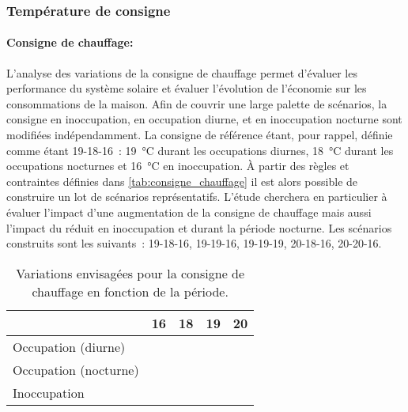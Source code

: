 \subsubsection{Température de consigne} %
\label{ssub:temperature_de_consigne}
\paragraph{Consigne de chauffage:} %
\label{par:consigne_de_chauffage}
L’analyse des variations de la consigne de chauffage permet d’évaluer les performance du
système solaire et évaluer l’évolution de l’économie sur les consommations de la maison.
Afin de couvrir une large palette de scénarios, la consigne en inoccupation, en occupation
diurne, et en inoccupation nocturne sont modifiées indépendamment. La consigne de
référence étant, pour rappel, définie comme étant 19-18-16~: \SI{19}{\celsius} durant les
occupations diurnes, \SI{18}{\celsius} durant les occupations nocturnes et
\SI{16}{\celsius} en inoccupation. À partir des règles et contraintes définies dans
\autoref{tab:consigne_chauffage} il est alors possible de construire un lot de scénarios
représentatifs. L’étude cherchera en particulier à évaluer l’impact d’une augmentation de
la consigne de chauffage mais aussi l’impact du réduit en inoccupation et durant la
période nocturne. Les scénarios construits sont les suivants~: 19-18-16, 19-19-16,
19-19-19, 20-18-16, 20-20-16.

\begin{table}
\centering
\begin{tabular}{| l | c | c | c | c |}
    \hline
                    & \bf{16}             & \bf{18}             & \bf{19}             & \bf{20}              \\
    \hline
Occupation (diurne)    &                     &                     & \cellcolor{SolarizedBrBlue} & \cellcolor{SolarizedBrBlue} \\
    \hline
Occupation (nocturne)  &                     & \cellcolor{SolarizedBrBlue} & \cellcolor{SolarizedBrBlue} & \cellcolor{SolarizedBrBlue} \\
    \hline
Inoccupation         & \cellcolor{SolarizedBrBlue} &                     & \cellcolor{SolarizedBrBlue} &                     \\
    \hline
\end{tabular}
\caption{Variations envisagées pour la consigne de chauffage en fonction de la période.}
         \label{tab:consigne_chauffage}
\end{table}


